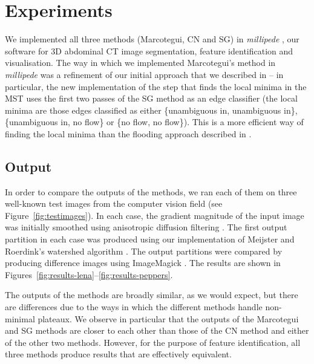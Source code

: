 \documentclass[review,a4paper]{elsarticle}
\begin{document}
\section{Experiments}
\label{sec:experiments}

We implemented all three methods (Marcotegui, CN and SG) in \emph{millipede} \cite{millipede}, our software for 3D abdominal CT image segmentation, feature identification and visualisation. The way in which we implemented Marcotegui's method in \emph{millipede} was a refinement of our initial approach that we described in \cite{golodetz08} -- in particular, the new implementation of the step that finds the local minima in the MST uses the first two passes of the SG method as an edge classifier (the local minima are those edges classified as either \{unambiguous in, unambiguous in\}, \{unambiguous in, no flow\} or \{no flow, no flow\}). This is a more efficient way of finding the local minima than the flooding approach described in \cite{golodetz08}.

\subsection{Output}

In order to compare the outputs of the methods, we ran each of them on three well-known test images from the computer vision field (see Figure~\ref{fig:testimages}). In each case, the gradient magnitude of the input image was initially smoothed using anisotropic diffusion filtering \cite{perona90}. The first output partition in each case was produced using our implementation of Meijster and Roerdink's watershed algorithm \cite{meijster98}. The output partitions were compared by producing difference images using ImageMagick \cite{imagemagick}. The results are shown in Figures~\ref{fig:results-lena}--\ref{fig:results-peppers}.

The outputs of the methods are broadly similar, as we would expect, but there are differences due to the ways in which the different methods handle non-minimal plateaux. We observe in particular that the outputs of the Marcotegui and SG methods are closer to each other than those of the CN method and either of the other two methods. However, for the purpose of feature identification, all three methods produce results that are effectively equivalent.
\end{document}
